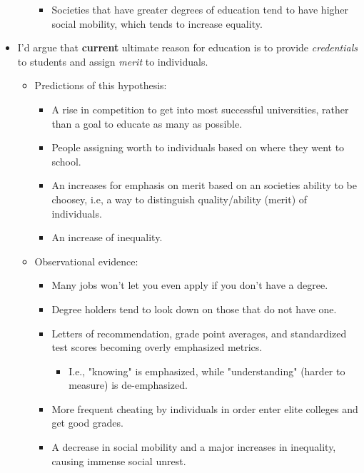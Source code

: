 \documentclass[12pt,a4paper]{article}
\begin{document}
\begin{itemize}
\begin{itemize}
\begin{itemize}
                    \item Societies that have greater degrees of education tend to have higher social mobility, which tends to increase equality.
                \end{itemize}
        \end{itemize}
    \item I'd argue that \textbf{current} ultimate reason for education is to provide \textit{credentials} to students and assign \textit{merit} to individuals. 
        \begin{itemize}
            \item Predictions of this hypothesis:
                \begin{itemize}
                    \item A rise in competition to get into most successful universities, rather than a goal to educate as many as possible.
                    \item People assigning worth to individuals based on where they went to school.
                    \item An increases for emphasis on merit based on an societies ability to be choosey, i.e, a way to  distinguish quality/ability (merit) of individuals.
                    \item An increase of inequality.
                \end{itemize}
            \item Observational evidence:
                \begin{itemize}
                    \item Many jobs won't let you even apply if you don't have a degree. 
                    \item Degree holders tend to look down on those that do not have one.
                    \item Letters of recommendation, grade point averages, and standardized test scores becoming overly emphasized metrics.
                        \begin{itemize}
                            \item I.e., "knowing" is emphasized, while "understanding" (harder to measure) is de-emphasized.
                        \end{itemize}
                    \item More frequent cheating by individuals in order enter elite colleges and get good grades.
                    \item A decrease in social mobility and a major increases in inequality, causing immense social unrest.

\end{itemize}
\end{itemize}
\end{itemize}
\end{document}
